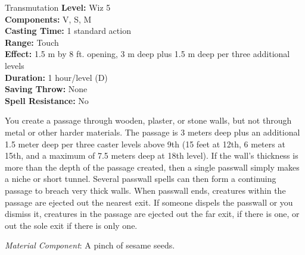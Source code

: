 {Transmutation}
{
	\textbf{Level:}
	Wiz 5\\
	\textbf{Components:}
	V, S, M\\
	\textbf{Casting Time:}
	1 standard action\\
	\textbf{Range:}
	Touch\\
	\textbf{Effect:}
	1.5 m by 8 ft. opening, 3 m deep plus 1.5 m deep per three additional levels\\
	\textbf{Duration:}
	1 hour/level (D)\\
	\textbf{Saving Throw:}
	None\\
	\textbf{Spell Resistance:}
	No\\
}
{
	You create a passage through wooden, plaster, or stone walls, but not through metal or other harder materials. The passage is 3 meters deep plus an additional 1.5 meter deep per three caster levels above 9th (15 feet at 12th, 6 meters at 15th, and a maximum of 7.5 meters deep at 18th level). If the wall's thickness is more than the depth of the passage created, then a single passwall simply makes a niche or short tunnel. Several passwall spells can then form a continuing passage to breach very thick walls. When passwall ends, creatures within the passage are ejected out the nearest exit. If someone dispels the passwall or you dismiss it, creatures in the passage are ejected out the far exit, if there is one, or out the sole exit if there is only one.

	\textit{Material Component}:
	A pinch of sesame seeds.

}
